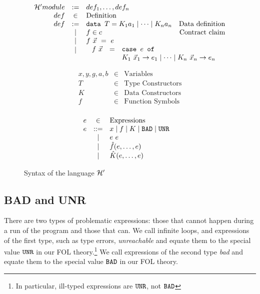 \documentclass[preprint]{sigplanconf}
\begin{document}
\begin{figure}[h]
  \centering
  \[
  \begin{array}{rclr}
    \hprime module &:=& def_1,\dots,def_n &\\
    def &\in& \mbox{Definition} & \\
    def &:=& \texttt{data } T = K_1 a_1 \mid \cdots \mid K_n a_n& \mbox{Data definition}\\
    &\mid& f \in c & \mbox{Contract claim}\\
    &\mid& f~\vec{x}~=~e & \\
    &\raisebox{ 0.18 cm }{$\mid$}& \multicolumn{2}{c}{
      \begin{array}{rcl}
        \hspace{-0.2cm} f~\vec{x} &=& \texttt{case } e \texttt{ of } \\
         && K_1~\vec{x}_1 \to e_1 \mid \cdots \mid K_n~\vec{x}_n \to e_n \\
       \end{array}
       } \\
  \end{array} \]
  
  \[  \begin{array}{rclr}
    x,y,g,a,b & \in & \mbox{Variables} \\
    T &\in& \mbox{Type Constructors} \\
    K &\in& \mbox{Data Constructors} \\
    f &\in& \text{Function Symbols} \\
  \end{array} \]

  \[  \begin{array}{rclr}
    e &\in& \mbox{Expressions} & \\
    e &::=& x \mid f \mid K \mid \texttt{BAD} \mid \texttt{UNR} & \\
    &\mid& e~e & \\
    &\mid& \hat{f}(e,\dots,e) & \\
    &\mid& \hat{K}(e,\dots,e) & \\
  \end{array} \]

\caption{Syntax of the language $\mathcal{H}'$}
\label{fig:hprime-syntax}
\end{figure}

\subsection{BAD and UNR}
There are two types of problematic expressions: those that cannot
happen during a run of the program and those that can.  We call
infinite loops, and expressions of the first type, such as type
errors, \emph{unreachable} and equate them to the special value $\texttt{UNR}$
in our FOL theory.\footnote{
%
In particular, ill-typed expressions are $\texttt{UNR}$, not $\texttt{BAD}$
%
} We call expressions of the second type \emph{bad} and equate them to
the special value $\texttt{BAD}$ in our FOL theory.
\end{document}
